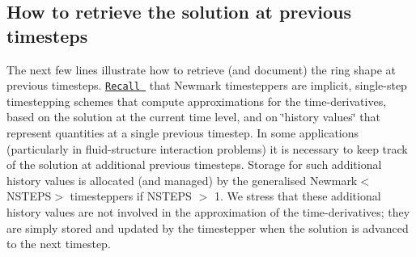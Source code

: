 \hypertarget{index_prev}{}\subsection{How to retrieve the solution at previous timesteps}\label{index_prev}
The next few lines illustrate how to retrieve (and document) the ring shape at previous timesteps. \href{../../../linear_wave/two_d_linear_wave/html/index.html#IC}{\tt Recall } that {\ttfamily Newmark} timesteppers are implicit, single-\/step timestepping schemes that compute approximations for the time-\/derivatives, based on the solution at the current time level, and on \char`\"{}history values\char`\"{} that represent quantities at a single previous timestep. In some applications (particularly in fluid-\/structure interaction problems) it is necessary to keep track of the solution at additional previous timesteps. Storage for such additional history values is allocated (and managed) by the generalised {\ttfamily Newmark$<$\+N\+S\+T\+E\+P\+S$>$} timesteppers if {\ttfamily N\+S\+T\+E\+PS} $>$ 1. We stress that these additional history values are not involved in the approximation of the time-\/derivatives; they are simply stored and updated by the timestepper when the solution is advanced to the next timestep.


